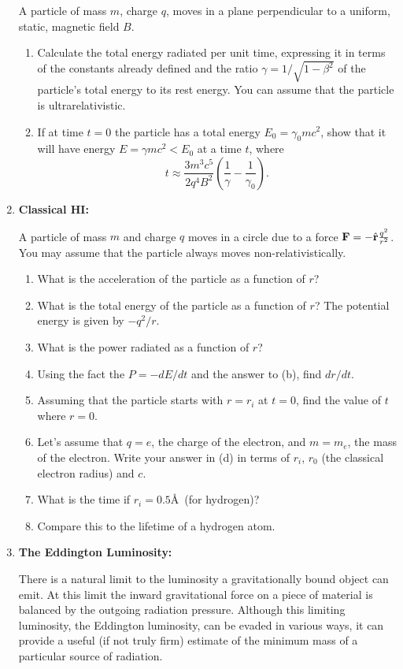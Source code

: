 \begin{enumerate}
A particle of mass $m$, charge $q$, moves in a plane perpendicular to
a uniform, static, magnetic field $B$.
\begin{enumerate}
\item
Calculate the total energy radiated per unit time, expressing it in
terms of the constants already defined and the ratio
$\gamma=1/\sqrt{1-\beta^2}$ of the particle's total energy to its rest 
energy.  You can assume that the particle is ultrarelativistic.
\item
If at time $t=0$ the particle has a total energy $E_0=\gamma_0 m c^2$,
show that it will have energy $E=\gamma m c^2 < E_0$ at a time $t$,
where
\[
t \approx \frac{3 m^3 c^5}{2 q^4 B^2} \left ( \frac{1}{\gamma} -
\frac{1}{\gamma_0} \right ).
\]
\end{enumerate}

\item{\bf Classical HI:}

A particle of mass $m$ and charge $q$ moves in a circle due to a force 
${\bf F} = -\hat{\bf r} \frac{q^2}{r^2}$.  
You may assume that the particle always moves  non-relativistically.
\begin{enumerate}
\item What is the acceleration of the particle as a function of $r$?
\item What is the total energy of the particle as a function of $r$?
  The potential energy is given by $-q^2/r$.
\item What is the power radiated as a function of $r$?
\item Using the fact the $P=-dE/dt$ and the answer to (b), find
  $dr/dt$. 
\item Assuming that the particle starts with $r=r_i$ at $t=0$, find
  the value of $t$ where $r=0$.   
\item Let's assume that $q=e$, the charge of the electron, and
  $m=m_e$, the mass of the electron.  Write your answer in (d) in
  terms of $r_i$, $r_0$ (the classical electron radius) and $c$.
\item What is the time if $r_i=0.5$\AA\ (for hydrogen)?
\item Compare this to the lifetime of a hydrogen atom.
\end{enumerate}

\item{\bf The Eddington Luminosity:} 

  There is a natural limit to the luminosity a gravitationally bound
  object can emit. At this limit the inward gravitational force on a
  piece of material is balanced by the outgoing radiation
  pressure. Although this limiting luminosity, the Eddington
  luminosity, can be evaded in various ways, it can provide a useful
  (if not truly firm) estimate of the minimum mass of a particular
  source of radiation.


\end{enumerate}
